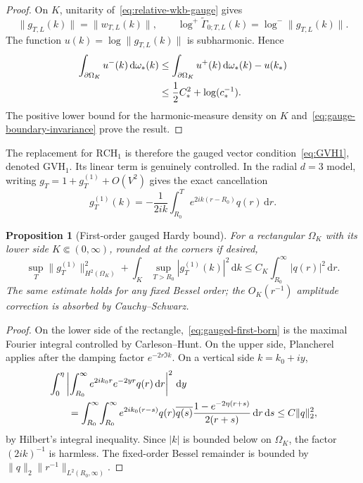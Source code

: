 \documentclass[11pt]{article}
\newcommand{\dd}{\,\mathrm d}
\newtheorem{proposition}[theorem]{Proposition}
\theoremstyle{definition}
\theoremstyle{remark}
\begin{document}
\begin{proof}
On $K$, unitarity of~\eqref{eq:relative-wkb-gauge} gives
\begin{equation}
 \|g_{T,L}(k)\|=\|w_{T,L}(k)\|,
 \qquad
 \log^+\widetilde\Gamma_{0;T,L}(k)
 =\log^-\|g_{T,L}(k)\|.
 \label{eq:gauge-boundary-invariance}
\end{equation}
The function $u(k)=\log\|g_{T,L}(k)\|$ is subharmonic.  Hence
\begin{align}
 \int_{\partial\Omega_K}u^-(k)\dd\omega_*(k)
 &\leq
 \int_{\partial\Omega_K}u^+(k)\dd\omega_*(k)-u(k_*)\notag\\
 &\leq\frac12C_*^2+\log(c_*^{-1}).
 \label{eq:vector-harmonic-measure}
\end{align}
The positive lower bound for the harmonic-measure density on $K$ and~\eqref{eq:gauge-boundary-invariance} prove the result.
\end{proof}

The replacement for $\mathrm{RCH}_1$ is therefore the gauged vector condition~\eqref{eq:GVH1}, denoted $\mathrm{GVH}_1$.  Its linear term is genuinely controlled.  In the radial $d=3$ model, writing $g_T=1+g_T^{(1)}+O(V^2)$ gives the exact cancellation
\begin{equation}
 g_T^{(1)}(k)
 =-\frac1{2ik}\int_{R_0}^T
   e^{2ik(r-R_0)}q(r)\dd r.
 \label{eq:gauged-first-born}
\end{equation}

\begin{proposition}[First-order gauged Hardy bound]\label{prop:gauged-first-order}
For a rectangular $\Omega_K$ with its lower side $K\Subset(0,\infty)$, rounded at the corners if desired,
\begin{equation}
 \sup_T\|g_T^{(1)}\|_{H^2(\Omega_K)}^2
 +\int_K\sup_{T>R_0}|g_T^{(1)}(k)|^2\dd k
 \leq C_K\int_{R_0}^\infty|q(r)|^2\dd r.
 \label{eq:gauged-first-order-bound}
\end{equation}
The same estimate holds for any fixed Bessel order; the $O_K(r^{-1})$ amplitude correction is absorbed by Cauchy--Schwarz.
\end{proposition}

\begin{proof}
On the lower side of the rectangle,~\eqref{eq:gauged-first-born} is the maximal Fourier integral controlled by Carleson--Hunt.  On the upper side, Plancherel applies after the damping factor $e^{-2r\Im k}$.  On a vertical side $k=k_0+iy$,
\begin{align}
 &\int_0^\eta
 \left|\int_{R_0}^\infty e^{2ik_0r}e^{-2yr}q(r)\dd r\right|^2\dd y\notag\\
 &\qquad=\int_{R_0}^\infty\!\int_{R_0}^\infty
 e^{2ik_0(r-s)}q(r)\overline{q(s)}
 \frac{1-e^{-2\eta(r+s)}}{2(r+s)}\dd r\dd s
 \leq C\|q\|_2^2,
 \label{eq:vertical-laplace-bound}
\end{align}
by Hilbert's integral inequality.  Since $|k|$ is bounded below on $\Omega_K$, the factor $(2ik)^{-1}$ is harmless.  The fixed-order Bessel remainder is bounded by
$\|q\|_2\|r^{-1}\|_{L^2(R_0,\infty)}$.
\end{proof}
\end{document}
